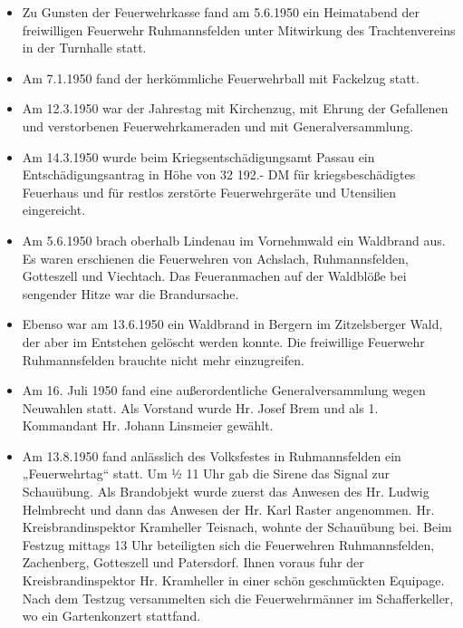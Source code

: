 \documentclass[12pt,a4paper]{book}
\begin{document}
\begin{itemize}
\item Zu Gunsten der Feuerwehrkasse fand am 5.6.1950 ein Heimatabend der
freiwilligen Feuerwehr Ruhmannsfelden unter Mitwirkung des
Trachtenvereins in der Turnhalle statt.

\item Am 7.1.1950 fand der herkömmliche Feuerwehrball mit Fackelzug
statt.

\item Am 12.3.1950 war der Jahrestag mit Kirchenzug, mit Ehrung der
Gefallenen und verstorbenen Feuerwehrkameraden und mit
Generalversammlung.

\item Am 14.3.1950 wurde beim Kriegsentschädigungsamt Passau ein
Entschädigungsantrag in Höhe von 32 192.- DM für kriegsbeschädigtes
Feuerhaus und für restlos zerstörte Feuerwehrgeräte und Utensilien
eingereicht.

\item Am 5.6.1950 brach oberhalb Lindenau im Vornehmwald ein Waldbrand
aus. Es waren erschienen die Feuerwehren von Achslach, Ruhmannsfelden,
Gotteszell und Viechtach. Das Feueranmachen auf der Waldblöße bei
sengender Hitze war die Brandursache.

\item Ebenso war am 13.6.1950 ein Waldbrand in Bergern im Zitzelsberger
Wald, der aber im Entstehen gelöscht werden konnte. Die freiwillige
Feuerwehr Ruhmannsfelden brauchte nicht mehr einzugreifen.

\item Am 16. Juli 1950 fand eine außerordentliche Generalversammlung
wegen Neuwahlen statt. Als Vorstand wurde Hr. Josef Brem und als 1.
Kommandant Hr. Johann Linsmeier gewählt.

\item Am 13.8.1950 fand anlässlich des Volksfestes in Ruhmannsfelden ein
„Feuerwehrtag“ statt. Um ½ 11 Uhr gab die Sirene das Signal zur
Schauübung. Als Brandobjekt wurde zuerst das Anwesen des Hr. Ludwig
Helmbrecht und dann das Anwesen der Hr. Karl Raster angenommen. Hr.
Kreisbrandinspektor Kramheller Teisnach, wohnte der Schauübung bei. Beim
Festzug mittags 13 Uhr beteiligten sich die Feuerwehren Ruhmannsfelden,
Zachenberg, Gotteszell und Patersdorf. Ihnen voraus fuhr der
Kreisbrandinspektor Hr. Kramheller in einer schön geschmückten Equipage.
Nach dem Testzug versammelten sich die Feuerwehrmänner im
Schafferkeller, wo ein Gartenkonzert stattfand.


\end{itemize}
\end{document}
